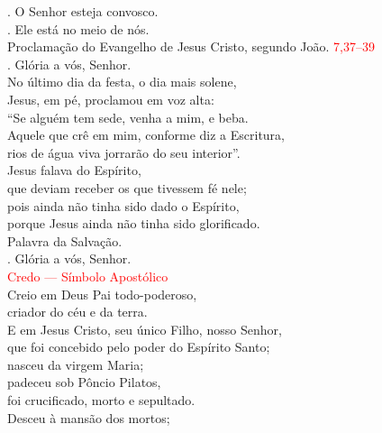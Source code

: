 \documentclass{book}
\begin{document}
\begin{flushleft}

    \vspace{.2cm}
    {\color{red} \Vbar.} O Senhor esteja convosco. \\
    {\color{red} \Rbar.} Ele está no meio de nós.
    \vspace{.1cm} \\
    {\color{red} \grecross} Proclamação do Evangelho de Jesus Cristo, segundo João.
    \hspace{\fill}
    \textcolor{red}{7,37--39} \\
    {\color{red} \Rbar.} Glória a vós, Senhor.
    \vspace{.2cm} \\
    No último dia da festa, o dia mais solene, \\
    Jesus, em pé, proclamou em voz alta: \\
    ``Se alguém tem sede, venha a mim, e beba. \\
    Aquele que crê em mim, conforme diz a Escritura, \\
    rios de água viva jorrarão do seu interior''. \\
    Jesus falava do Espírito, \\
    que deviam receber os que tivessem fé nele; \\
    pois ainda não tinha sido dado o Espírito, \\
    porque Jesus ainda não tinha sido glorificado.
    \vspace{.1cm} \\
    Palavra da Salvação. \\
    {\color{red} \Rbar.} Glória a vós, Senhor.
    \vspace{.2cm} \\
    \textcolor{red}{Credo --- Símbolo Apostólico}
    \vspace{.2cm} \\
    Creio em Deus Pai todo-poderoso, \\
    criador do céu e da terra. \\
    E em Jesus Cristo, seu único Filho, nosso Senhor, \\
    que foi concebido pelo poder do Espírito Santo; \\
    nasceu da virgem Maria; \\
    padeceu sob Pôncio Pilatos, \\
    foi crucificado, morto e sepultado. \\
    Desceu à mansão dos mortos; \\

\end{flushleft}
\end{document}
